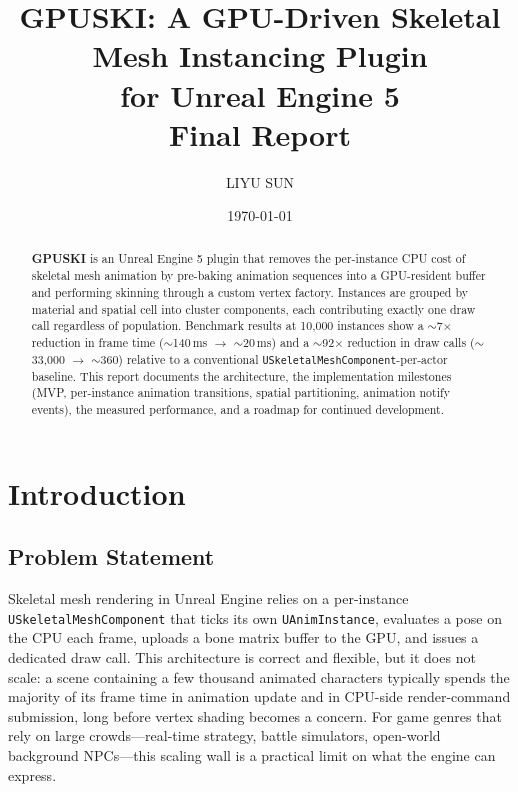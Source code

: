 \documentclass[11pt, a4paper]{article}
\title{\textbf{GPUSKI: A GPU-Driven Skeletal Mesh Instancing Plugin \\ for Unreal Engine 5} \\[0.5em]
\large Final Report}
\author{LIYU SUN}
\date{\today}
\begin{document}
\maketitle

\begin{abstract}
\noindent \textbf{GPUSKI} is an Unreal Engine 5 plugin that removes the per-instance CPU cost of skeletal mesh animation by pre-baking animation sequences into a GPU-resident buffer and performing skinning through a custom vertex factory. Instances are grouped by material and spatial cell into cluster components, each contributing exactly one draw call regardless of population. Benchmark results at 10{,}000 instances show a $\sim$7$\times$ reduction in frame time ($\sim$140\,ms $\to$ $\sim$20\,ms) and a $\sim$92$\times$ reduction in draw calls ($\sim$33{,}000 $\to$ $\sim$360) relative to a conventional \texttt{USkeletalMeshComponent}-per-actor baseline. This report documents the architecture, the implementation milestones (MVP, per-instance animation transitions, spatial partitioning, animation notify events), the measured performance, and a roadmap for continued development.
\end{abstract}

\tableofcontents
\newpage

\section{Introduction}

\subsection{Problem Statement}

Skeletal mesh rendering in Unreal Engine relies on a per-instance \texttt{USkeletal\-MeshComponent} that ticks its own \texttt{UAnimInstance}, evaluates a pose on the CPU each frame, uploads a bone matrix buffer to the GPU, and issues a dedicated draw call. This architecture is correct and flexible, but it does not scale: a scene containing a few thousand animated characters typically spends the majority of its frame time in animation update and in CPU-side render-command submission, long before vertex shading becomes a concern. For game genres that rely on large crowds---real-time strategy, battle simulators, open-world background NPCs---this scaling wall is a practical limit on what the engine can express.
\end{document}
